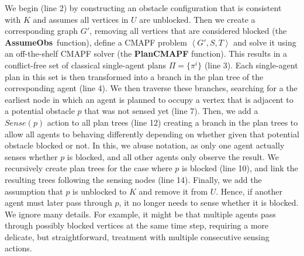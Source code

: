 \documentclass[letterpaper]{article} %
\newcommand{\assumeObs}{\textbf{AssumeObs}}
\newcommand{\tuple}[1]{\ensuremath{\left \langle #1 \right \rangle }}
\begin{document}
We begin (line 2) by constructing an obstacle configuration that is consistent with $K$ and assumes all vertices in $U$ are unblocked.
Then we create a corresponding graph $G'$, removing all vertices that are considered blocked (the \assumeObs\ function), define a CMAPF problem $\tuple{G',S,T}$ and solve it using an off-the-shelf CMAPF solver  (the \textbf{PlanCMAPF} function).
This results in a conflict-free set of classical single-agent plans $\Pi=\{\pi^i\}$  (line 3). Each single-agent plan in this set is then transformed into a branch in the plan tree of the corresponding agent (line 4).
We then traverse these branches, searching for a the earliest node in which an agent is planned to occupy a vertex that is adjacent to a potential obstacle $p$ that was not sensed yet (line 7).
Then, we add a $Sense(p)$ action to all plan trees (line 12)  creating a branch in the plan trees to allow all agents to behaving differently depending on whether given that potential obstacle blocked or not.
In this, we abuse notation, as only one agent actually senses whether $p$ is blocked, and all other agents only observe the result.
We recursively create plan trees for the case where $p$ is blocked (line 10), and link the resulting trees following the sensing nodes (line 14).
Finally, we add the assumption that $p$ is unblocked to $K$ and remove it from $U$. Hence, if another agent must later pass through $p$, it no longer needs to sense whether it is blocked.
We ignore many details. For example, it might be that multiple agents pass through possibly blocked vertices at the same time step, requiring a more delicate, but straightforward, treatment with multiple consecutive sensing actions.
\end{document}
